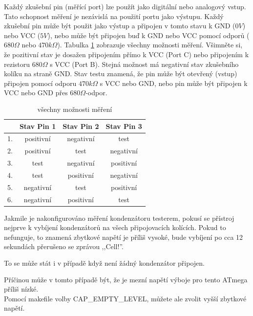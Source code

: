 Každý zkušební pin (měřící port) lze použít jako digitální nebo analogový vstup.
Tato schopnost měření je nezávislá na použití portu jako výstupu.
Každý zkušební pin může být použit jako výstup a připojen v tomto stavu k GND (\(0V\)) nebo VCC (\(5V\)),
nebo může být připojen buď k GND nebo VCC pomocí odporů (\(680\Omega\) nebo \(470k\Omega\)).
Tabulka \ref{tab:case} zobrazuje všechny možnosti měření.
Všimněte si, že pozitivní stav je dosažen připojením přímo k VCC (Port C) nebo
připojením k rezistoru \(680\Omega\) s VCC (Port B).
Stejná možnost má negativní stav zkušebního kolíku na straně GND.
Stav testu znamená, že pin může být otevřený (vstup) připojen pomocí odporu \(470k\Omega\) s VCC nebo GND,
nebo pin může být připojen k VCC nebo GND přes \(680\Omega\)-odpor.

\begin{table}[H]
  \begin{center}
    \begin{tabular}{| l | c | c | c |}
    \hline
      & Stav Pin 1 & Stav Pin 2 & Stav Pin 3 \\
    \hline
   1. & positivní    &  negativní   &  test \\
   2. & positivní    &  test      & negativní \\
   3. & test       &  negativní   & positivní \\
   4. & test       &  positivní   & negativní \\
   5. & negativní    &  test      & positivní \\
   6. & negativní    &  positivní   &  test  \\
    \hline
    \end{tabular}
  \end{center}
  \caption{všechny možnosti měření}
  \label{tab:case} 
\end{table}

Jakmile je nakonfigurováno měření kondenzátoru testerem,  pokusí se přístroj nejprve
k vybíjení kondenzátorů na všech připojovacích kolících.
Pokud to nefunguje, to znamená zbytkové napětí je příliš vysoké, bude vybíjení
po cca 12 sekundách přerušeno se zprávou ,,Cell!''.

To se může stát i v případě když není žádný kondenzátor připojen.

Příčinou může v tomto případě být, že je mezní napětí výboje pro tento
ATmega příliš nízké.\\ Pomocí makefile volby CAP\_EMPTY\_LEVEL, můžete ale zvolit vyšší zbytkové napětí.
